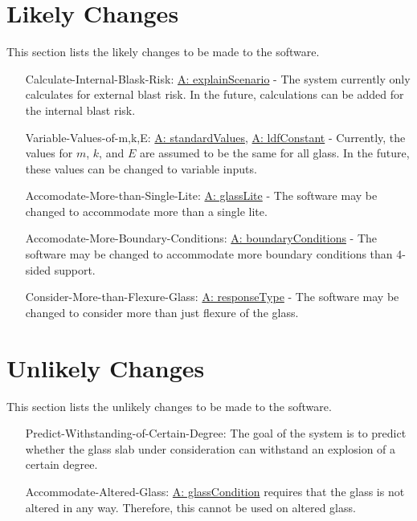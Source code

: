 \documentclass[12pt]{article}
\begin{document}
\section{Likely Changes}
\label{Sec:LCs}
This section lists the likely changes to be made to the software.
\begin{itemize}
\item[Calculate-Internal-Blask-Risk:\phantomsection\label{calcInternalBlastRisk}]\hyperref[assumpES]{A: explainScenario} - The system currently only calculates for external blast risk. In the future, calculations can be added for the internal blast risk.
\item[Variable-Values-of-m,k,E:\phantomsection\label{varValsOfmkE}]\hyperref[assumpSV]{A: standardValues}, \hyperref[assumpLDFC]{A: ldfConstant} - Currently, the values for $m$, $k$, and $E$ are assumed to be the same for all glass. In the future, these values can be changed to variable inputs.
\item[Accomodate-More-than-Single-Lite:\phantomsection\label{accMoreThanSingleLite}]\hyperref[assumpGL]{A: glassLite} - The software may be changed to accommodate more than a single lite.
\item[Accomodate-More-Boundary-Conditions:\phantomsection\label{accMoreBoundaryConditions}]\hyperref[assumpBC]{A: boundaryConditions} - The software may be changed to accommodate more boundary conditions than 4-sided support.
\item[Consider-More-than-Flexure-Glass:\phantomsection\label{considerMoreThanFlexGlass}]\hyperref[assumpRT]{A: responseType} - The software may be changed to consider more than just flexure of the glass.
\end{itemize}
\section{Unlikely Changes}
\label{Sec:UCs}
This section lists the unlikely changes to be made to the software.
\begin{itemize}
\item[Predict-Withstanding-of-Certain-Degree:\phantomsection\label{predictWithstandOfCertDeg}]The goal of the system is to predict whether the glass slab under consideration can withstand an explosion of a certain degree.
\item[Accommodate-Altered-Glass:\phantomsection\label{accAlteredGlass}]\hyperref[assumpGC]{A: glassCondition} requires that the glass is not altered in any way. Therefore, this cannot be used on altered glass.
\end{itemize}
\end{document}
